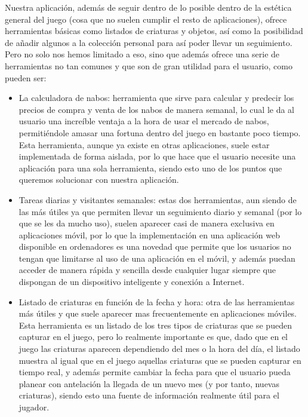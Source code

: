 Nuestra aplicación, además de seguir dentro de lo posible dentro de la estética general del juego (cosa que no suelen cumplir el resto de aplicaciones), ofrece herramientas básicas como listados de criaturas y objetos, así como la posibilidad de añadir algunos a la colección personal para así poder llevar un seguimiento.\\

Pero no solo nos hemos limitado a eso, sino que además ofrece una serie de herramientas no tan comunes y que son de gran utilidad para el usuario, como pueden ser:

\begin{itemize}
	\item La calculadora de nabos: herramienta que sirve para calcular y predecir los precios de compra y venta de los nabos de manera semanal, lo cual le da al usuario una increíble ventaja a la hora de usar el mercado de nabos, permitiéndole amasar una fortuna dentro del juego en bastante poco tiempo. Esta herramienta, aunque ya existe en otras aplicaciones, suele estar implementada de forma aislada, por lo que hace que el usuario necesite una aplicación para una sola herramienta, siendo esto uno de los puntos que queremos solucionar con nuestra aplicación.
	
	\item Tareas diarias y visitantes semanales: estas dos herramientas, aun siendo de las más útiles ya que permiten llevar un seguimiento diario y semanal (por lo que se les da mucho uso), suelen aparecer casi de manera exclusiva en aplicaciones móvil, por lo que la implementación en una aplicación web disponible en ordenadores es una novedad que permite que los usuarios no tengan que limitarse al uso de una aplicación en el móvil, y además puedan acceder de manera rápida y sencilla desde cualquier lugar siempre que dispongan de un dispositivo inteligente y conexión a Internet.
	
	\item Listado de criaturas en función de la fecha y hora: otra de las herramientas más útiles y que suele aparecer mas frecuentemente en aplicaciones móviles. Esta herramienta es un listado de los tres tipos de criaturas que se pueden capturar en el juego, pero lo realmente importante es que, dado que en el juego las criaturas aparecen dependiendo del mes o la hora del día, el listado muestra al igual que en el juego aquellas criaturas que se pueden capturar en tiempo real, y además permite cambiar la fecha para que el usuario pueda planear con antelación la llegada de un nuevo mes (y por tanto, nuevas criaturas), siendo esto una fuente de información realmente útil para el jugador.
	

\end{itemize}
